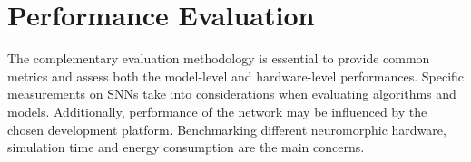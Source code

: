 \section{Performance Evaluation}
\label{sec:eval}
The complementary evaluation methodology is essential to provide common metrics and assess both the model-level and hardware-level performances.
Specific measurements on SNNs take into considerations when evaluating algorithms and models.
Additionally, performance of the network may be influenced by the chosen development platform.
Benchmarking different neuromorphic hardware, simulation time and energy consumption are the main concerns.


